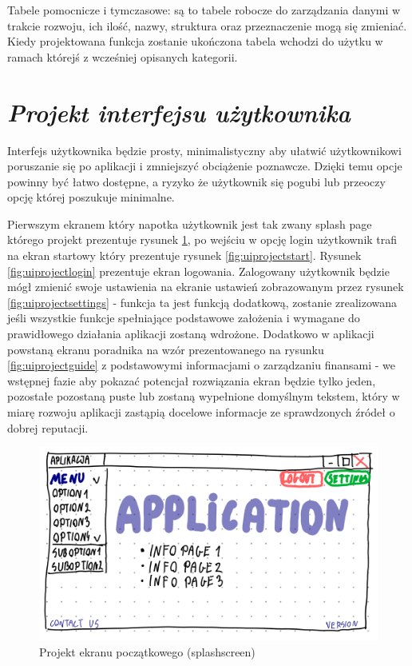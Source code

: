 \documentclass[a4paper, 10pt, twoside, openright]{report}
\newcommand{\customstylesection}[1]{\textbf{\textit{#1}}}
\begin{document}
\begin{large}
{Tabele pomocnicze i tymczasowe: są to tabele robocze do zarządzania danymi w 
trakcie rozwoju, ich ilość, nazwy, struktura oraz przeznaczenie mogą się 
zmieniać. Kiedy projektowana funkcja zostanie ukończona tabela wchodzi do użytku
 w ramach którejś z wcześniej opisanych kategorii.}

\section{\customstylesection{Projekt interfejsu użytkownika}}
{Interfejs użytkownika będzie prosty, minimalistyczny aby ułatwić użytkownikowi 
poruszanie się po aplikacji i zmniejszyć obciążenie poznawcze. Dzięki temu opcje
 powinny być łatwo dostępne, a ryzyko że użytkownik się pogubi lub przeoczy 
opcję której poszukuje minimalne.}

{Pierwszym ekranem który napotka użytkownik jest tak zwany splash page którego 
projekt prezentuje rysunek \ref*{fig:uiprojectsplash}, po wejściu w opcję login 
użytkownik trafi na ekran startowy który prezentuje rysunek 
\ref*{fig:uiprojectstart}. Rysunek \ref*{fig:uiprojectlogin} prezentuje ekran 
logowania. Zalogowany użytkownik będzie mógł zmienić swoje ustawienia na ekranie
 ustawień zobrazowanym przez rysunek \ref*{fig:uiprojectsettings} - funkcja ta 
jest funkcją dodatkową, zostanie zrealizowana jeśli wszystkie funkcje 
spełniające podstawowe założenia i wymagane do prawidłowego działania aplikacji 
zostaną wdrożone. Dodatkowo w aplikacji powstaną ekranu poradnika na wzór 
prezentowanego na rysunku \ref*{fig:uiprojectguide} z podstawowymi informacjami 
o zarządzaniu finansami - we wstępnej fazie aby pokazać potencjał rozwiązania 
ekran będzie tylko jeden, pozostałe pozostaną puste lub zostaną wypełnione 
domyślnym tekstem, który w miarę rozwoju aplikacji zastąpią docelowe informacje 
ze sprawdzonych źródeł o dobrej reputacji.}

\begin{figure}[H]           %
    \centering
    \includegraphics[width=12cm]{figures/Righten_UI_sketch_splashscreen.png}
    \caption{Projekt ekranu początkowego (splashscreen)}
    \label{fig:uiprojectsplash}
\end{figure}


\end{large}
\end{document}
